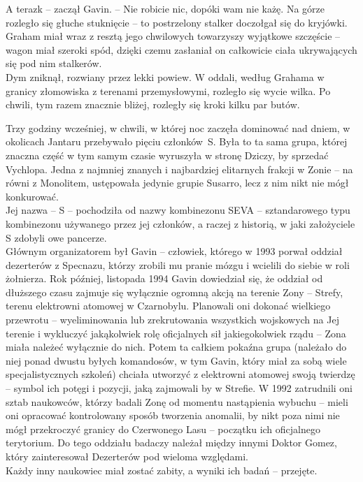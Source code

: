 \documentclass[../MAIN.tex]{subfiles}
\begin{document}
\sx A teraz\3k -- zaczął Gavin. -- Nie robicie nic, dopóki wam nie każę.
\qd
Na górze rozległo się głuche stuknięcie -- to postrzelony stalker doczołgał się do kryjówki. Graham miał wraz z resztą jego chwilowych towarzyszy wyjątkowe szczęście -- wagon miał szeroki spód, dzięki czemu zasłaniał on całkowicie ciała ukrywających się pod nim stalkerów.\\
Dym zniknął, rozwiany przez lekki powiew. W oddali, według Grahama w granicy złomowiska z terenami przemysłowymi, rozległo się wycie wilka. Po chwili, tym razem znacznie bliżej, rozległy się kroki kilku par butów.

Trzy godziny wcześniej, w chwili, w której noc zaczęła dominować nad dniem, w okolicach Jantaru przebywało pięciu członków~S. Była to ta sama grupa, której znaczna część w tym samym czasie wyruszyła w stronę Dziczy, by sprzedać Vychlopa. Jedna z najmniej znanych i najbardziej elitarnych frakcji w Zonie -- na równi z Monolitem, ustępowała jedynie grupie Susarro, lecz z nim nikt nie mógł konkurować.\\
Jej nazwa -- S -- pochodziła od nazwy kombinezonu SEVA -- sztandarowego typu kombinezonu używanego przez jej członków, a raczej z historią, w jaki założyciele S zdobyli owe pancerze.\\
Głównym organizatorem był Gavin -- człowiek, którego w 1993 porwał oddział dezerterów z Specnazu, którzy zrobili mu pranie mózgu i wcielili do siebie w roli żołnierza. Rok później, listopada 1994 Gavin dowiedział się, że oddział od dłuższego czasu zajmuje się wyłącznie ogromną akcją na terenie Zony -- Strefy, terenu elektrowni atomowej w Czarnobylu. Planowali oni dokonać wielkiego przewrotu -- wyeliminowania lub zrekrutowania wszystkich wojskowych na Jej terenie i wykluczyć jakąkolwiek rolę oficjalnych sił jakiegokolwiek rządu -- Zona miała należeć wyłącznie do nich. Potem ta całkiem pokaźna grupa (należało do niej ponad dwustu byłych komandosów, w tym Gavin, który miał za sobą wiele specjalistycznych szkoleń) chciała utworzyć z elektrowni atomowej swoją twierdzę -- symbol ich potęgi i pozycji, jaką zajmowali by w Strefie. W 1992 zatrudnili oni sztab naukowców, którzy badali Zonę od momentu nastąpienia wybuchu -- mieli oni opracować kontrolowany sposób tworzenia anomalii, by nikt poza nimi nie mógł 
przekroczyć granicy do Czerwonego Lasu -- początku ich oficjalnego terytorium. Do tego oddziału badaczy należał między innymi Doktor Gomez, który zainteresował Dezerterów pod wieloma względami.\\
Każdy inny naukowiec miał zostać zabity, a wyniki ich badań -- przejęte.
\end{document}

